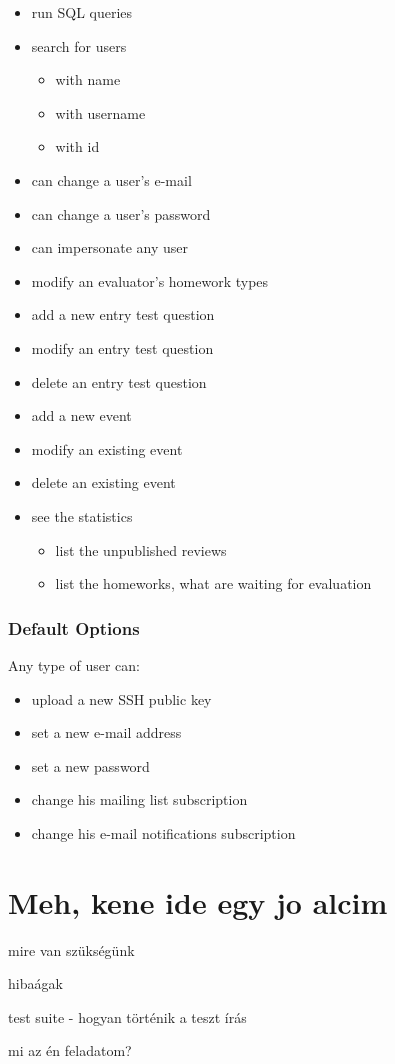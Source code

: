 \begin{itemize}
	\item run SQL queries
	\item search for users
	\begin{itemize}
		\item with name
		\item with username
		\item with id
	\end{itemize}
	\item can change a user's e-mail
	\item can change a user's password
	\item can impersonate any user
	\item modify an evaluator's homework types
	\item add a new entry test question
	\item modify an entry test question
	\item delete an entry test question
	\item add a new event
	\item modify an existing event
	\item delete an existing event
	\item see the statistics
	\begin{itemize}
		\item list the unpublished reviews
		\item list the homeworks, what are waiting for evaluation
	\end{itemize}
\end{itemize}

\subsubsection{Default Options}

Any type of user can:

\begin{itemize}
	\item upload a new SSH public key
	\item set a new e-mail address
	\item set a new password
	\item change his mailing list subscription
	\item change his e-mail notifications subscription
\end{itemize}

\section{Meh, kene ide egy jo alcim}

mire van szükségünk

hibaágak

test suite - hogyan történik a teszt írás

mi az én feladatom?